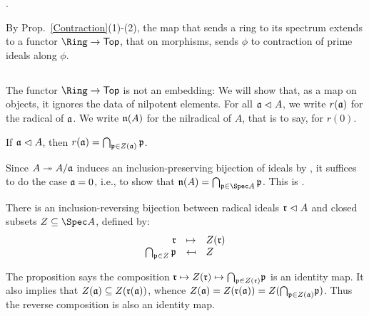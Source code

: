\documentclass[10pt,final,oneside]{amsbook}
\makeatletter
\renewenvironment{proof}[1][\proofname] 
{ 	
	\par\pushQED{\qed}\normalfont\topsep6\p@\@plus6\p@\relax\trivlist\itemindent\normalparindent
	\item[\hskip\labelsep\itshape#1\@addpunct{.}]\ignorespaces
}
{
	\popQED\endtrivlist\@endpefalse
}
\numberwithin{equation}{section}
\makeatother
\begin{document}
\begin{proof}
\cite[Ex.~1.22]{AM}.
\end{proof}

By Prop.~\ref{Contraction}(1)-(2), the map that sends a ring to its spectrum extends to a functor $\Ring \to \Top$, that on morphisms, sends $\phi$ to contraction of prime ideals along $\phi$.

\subsection{}

The functor $\Ring \to \Top$ is not an embedding:
We will show that, as a map on objects, it ignores the data of nilpotent elements.
For all $\mathfrak{a} \vartriangleleft A$, we write $r(\mathfrak{a})$ for the radical of $\mathfrak{a}$.
We write $\mathfrak{n}(A)$ for the nilradical of $A$, that is to say, for $r(0)$.

\begin{prop}
If $\mathfrak{a} \vartriangleleft A$, then $r(\mathfrak{a}) = \bigcap_{\mathfrak{p} \in Z(\mathfrak{a})} \mathfrak{p}$.
\end{prop}

\begin{proof}
Since $A \twoheadrightarrow A/\mathfrak{a}$ induces an inclusion-preserving bijection of ideals by \cite[1.1]{AM}, it suffices to do the case $\mathfrak{a} = 0$, i.e., to show that $\fr{n}(A) = \bigcap_{\fr{p} \in \Spec A} \fr{p}$.
This is \cite[1.8]{AM}.
\end{proof}

\begin{cor}\label{SpecNullstellensatz}
There is an inclusion-reversing bijection between radical ideals $\mathfrak{r} \vartriangleleft A$ and closed subsets $Z\subeq \Spec A$, defined by:
\begin{align}
\begin{array}{rcl}
\mathfrak{r}										&\mapsto 		&Z(\mathfrak{r})\\
\bigcap_{\mathfrak{p} \in Z} \mathfrak{p}	&\mapsfrom		&Z	
\end{array}
\end{align}
\end{cor}

\begin{proof}
The proposition says the composition $\mathfrak{r} \mapsto Z(\mathfrak{r}) \mapsto \smash{\bigcap_{\mathfrak{p} \in Z(\mathfrak{r})}} \mathfrak{p}$ is an identity map.
It also implies that $Z(\mathfrak{a}) \subseteq Z(\mathfrak{r}(\mathfrak{a}))$, whence $Z(\mathfrak{a}) = Z(\mathfrak{r}(\mathfrak{a})) = Z(\smash{\bigcap_{\mathfrak{p} \in Z(\mathfrak{a})}} \mathfrak{p})$.
Thus the reverse composition is also an identity map.
\end{proof}
\end{document}
